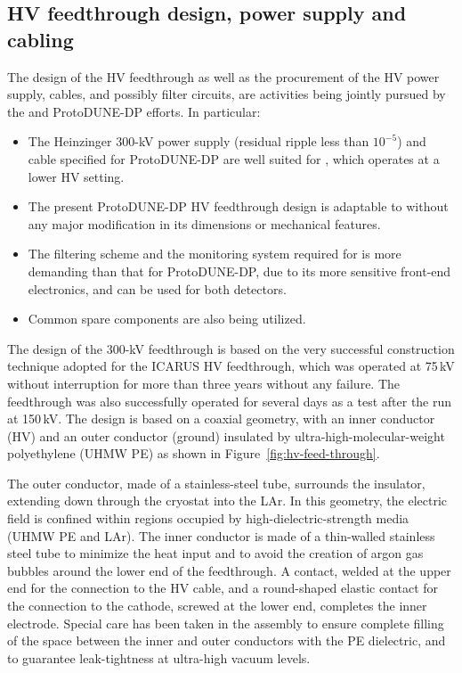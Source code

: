 \subsection{HV feedthrough design, power supply and cabling}
The design of the HV feedthrough as well as the procurement of the HV power supply, cables, and possibly filter
circuits, are activities being jointly pursued by the \pdsp and ProtoDUNE-DP efforts. In particular:

\begin{itemize}	
\item The Heinzinger 300-kV power supply (residual ripple less than $10^{-5}$) and cable specified for ProtoDUNE-DP  are  well suited for \pdsp, which operates at a lower HV setting.
\item The present ProtoDUNE-DP HV feedthrough design is adaptable to \pdsp without any major modification in its dimensions or mechanical features.
\item The filtering scheme and the monitoring system required for \pdsp is more demanding than that for ProtoDUNE-DP, due to its more sensitive front-end electronics, and can be used for both detectors.
\item Common spare components are also being utilized.
\end{itemize}

The %
design of the 300-kV feedthrough is based on the very successful construction technique adopted for the ICARUS HV feedthrough, which was operated at 75\,kV without interruption for more than three years without any failure. The feedthrough was also successfully operated for several days as a test after the run at 150\,kV.  
The design is based on a coaxial geometry, with an inner conductor (HV) and an outer conductor (ground) insulated by ultra-high-molecular-weight polyethylene (UHMW PE)  as shown in Figure~\ref{fig:hv-feed-through}. 

The outer conductor, made of a stainless-steel tube, surrounds the insulator, extending down through the cryostat into the LAr. 
In this geometry, the electric field is %
confined within regions occupied by high-dielectric-strength media (UHMW PE and LAr).  The inner conductor is made of a thin-walled stainless steel tube to minimize the heat input and to avoid the creation of argon gas bubbles around the lower end of the feedthrough. A contact, welded at the upper end for the
connection to the HV cable, and a round-shaped elastic contact for the connection to the cathode, screwed at the lower end, completes the inner electrode. Special care has been taken in the assembly to ensure complete filling  of the space between the inner and outer conductors with the PE dielectric, and to guarantee leak-tightness at ultra-high vacuum levels.


